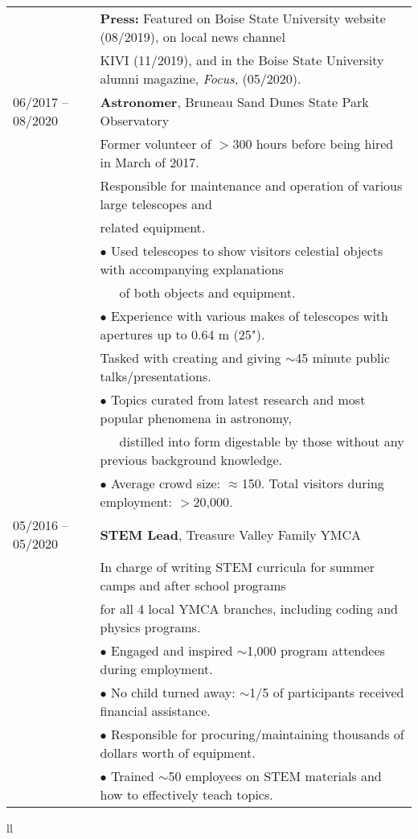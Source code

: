 \documentclass[11pt]{article}
\begin{document}
\begin{tabular}{ll}
      & \textbf{Press:} Featured on Boise State University website (08/2019), on local news channel\\
      & KIVI (11/2019), and in the Boise State University alumni magazine, \textit{Focus}, (05/2020). \vspace{2mm} \\
06/2017 -- 08/2020   &   \textbf{Astronomer}, Bruneau Sand Dunes State Park Observatory \\
      & Former volunteer of $>$300 hours before being hired in March of 2017.\vspace{1mm} \\
      & Responsible for maintenance and operation of various large telescopes and \\
      & related equipment.\\
      & $\bullet$ Used telescopes to show visitors celestial objects with accompanying explanations\\
      & \-\ \-\ \-\ of both objects and equipment.\\
      & $\bullet$ Experience with various makes of telescopes with apertures up to 0.64 m (25").\vspace{1mm} \\
      & Tasked with creating and giving $\sim$45 minute public talks/presentations.\\
      & $\bullet$ Topics curated from latest research and most popular phenomena in astronomy, \\
      & \-\ \-\ \-\ distilled into form digestable by those without any previous background knowledge.\\
      & $\bullet$ Average crowd size: $\approx$150. Total visitors during employment: $>$20,000.\vspace{2mm}\\
05/2016 -- 05/2020   &   \textbf{STEM Lead}, Treasure Valley Family YMCA \vspace{1mm} \\
      & In charge of writing STEM curricula for summer camps and after school programs \\
      & for all 4 local YMCA branches, including coding and physics programs. \vspace{0.5mm}\\
      & $\bullet$ Engaged and inspired $\sim$1,000 program attendees during employment. \\
      & $\bullet$ No child turned away: $\sim$1/5 of participants received financial assistance. \\
      & $\bullet$ Responsible for procuring/maintaining thousands of dollars worth of equipment. \\
      & $\bullet$ Trained $\sim$50 employees on STEM materials and how to effectively teach topics. \vspace{2mm} \\
\end{tabular}{ll}
\end{document}
